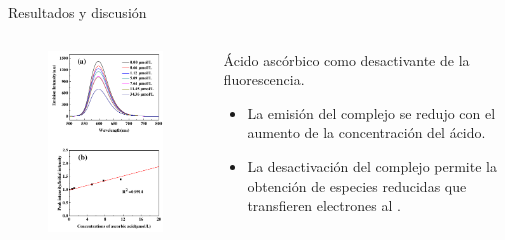 \documentclass[handout]{beamer}
\begin{document}
\begin{frame}{Resultados y discusi\'on}
	\begin{columns}
		\begin{column}{0.4\textwidth}
			\begin{figure}[h]
				\centering
				\includegraphics[width=\linewidth]{sources/uv}
			\end{figure}
		\end{column}
		\begin{column}{0.6\textwidth}
			\'Acido asc\'orbico como desactivante de la fluorescencia.
			\begin{itemize}
				\item La emisi\'on del complejo se redujo con el aumento de la concentraci\'on del \'acido.
				\item La desactivaci\'on del complejo permite la obtenci\'on de especies reducidas que transfieren electrones al . 
			\end{itemize}
		\end{column}
	\end{columns}
\end{frame}
\end{document}
